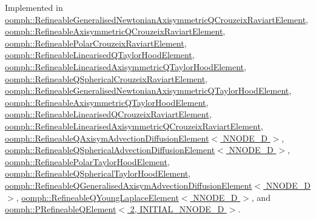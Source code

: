 Implemented in \hyperlink{classoomph_1_1RefineableGeneralisedNewtonianAxisymmetricQCrouzeixRaviartElement_abb293aeb834d1edf4d9f9e0150259e55}{oomph\+::\+Refineable\+Generalised\+Newtonian\+Axisymmetric\+Q\+Crouzeix\+Raviart\+Element}, \hyperlink{classoomph_1_1RefineableAxisymmetricQCrouzeixRaviartElement_a00d870c55a1a8e6596895d4efb5b3db5}{oomph\+::\+Refineable\+Axisymmetric\+Q\+Crouzeix\+Raviart\+Element}, \hyperlink{classoomph_1_1RefineablePolarCrouzeixRaviartElement_a4dabb74925f410045d1d7208a3b29130}{oomph\+::\+Refineable\+Polar\+Crouzeix\+Raviart\+Element}, \hyperlink{classoomph_1_1RefineableLinearisedQTaylorHoodElement_a744e9dabce8e94de320d9baa362786af}{oomph\+::\+Refineable\+Linearised\+Q\+Taylor\+Hood\+Element}, \hyperlink{classoomph_1_1RefineableLinearisedAxisymmetricQTaylorHoodElement_a6675183eb8c772e5a6129be446c8554e}{oomph\+::\+Refineable\+Linearised\+Axisymmetric\+Q\+Taylor\+Hood\+Element}, \hyperlink{classoomph_1_1RefineableQSphericalCrouzeixRaviartElement_a4604904cbdb052492917860518b01aa7}{oomph\+::\+Refineable\+Q\+Spherical\+Crouzeix\+Raviart\+Element}, \hyperlink{classoomph_1_1RefineableGeneralisedNewtonianAxisymmetricQTaylorHoodElement_aef635d4f6f88c070bf0eeda652639795}{oomph\+::\+Refineable\+Generalised\+Newtonian\+Axisymmetric\+Q\+Taylor\+Hood\+Element}, \hyperlink{classoomph_1_1RefineableAxisymmetricQTaylorHoodElement_ae98562e5c0460648cf785dce08aac278}{oomph\+::\+Refineable\+Axisymmetric\+Q\+Taylor\+Hood\+Element}, \hyperlink{classoomph_1_1RefineableLinearisedQCrouzeixRaviartElement_afc31da5de97e9cc03bfc6106e08820f3}{oomph\+::\+Refineable\+Linearised\+Q\+Crouzeix\+Raviart\+Element}, \hyperlink{classoomph_1_1RefineableLinearisedAxisymmetricQCrouzeixRaviartElement_ad2ea85dbb9ac3434f4314a020b45861f}{oomph\+::\+Refineable\+Linearised\+Axisymmetric\+Q\+Crouzeix\+Raviart\+Element}, \hyperlink{classoomph_1_1RefineableQAxisymAdvectionDiffusionElement_a876b090aa3813d3837218a5aecb64404}{oomph\+::\+Refineable\+Q\+Axisym\+Advection\+Diffusion\+Element$<$ N\+N\+O\+D\+E\+\_\+D $>$}, \hyperlink{classoomph_1_1RefineableQSphericalAdvectionDiffusionElement_a0ad422bfa10c757b2cbc3d56209ea642}{oomph\+::\+Refineable\+Q\+Spherical\+Advection\+Diffusion\+Element$<$ N\+N\+O\+D\+E\+\_\+D $>$}, \hyperlink{classoomph_1_1RefineablePolarTaylorHoodElement_aee481f421b3b57536ba7a929f760a337}{oomph\+::\+Refineable\+Polar\+Taylor\+Hood\+Element}, \hyperlink{classoomph_1_1RefineableQSphericalTaylorHoodElement_a2a183774e0992f6464b39b525552b985}{oomph\+::\+Refineable\+Q\+Spherical\+Taylor\+Hood\+Element}, \hyperlink{classoomph_1_1RefineableQGeneralisedAxisymAdvectionDiffusionElement_aea4690891aa8c7a5d0cbb65eb101a3e9}{oomph\+::\+Refineable\+Q\+Generalised\+Axisym\+Advection\+Diffusion\+Element$<$ N\+N\+O\+D\+E\+\_\+D $>$}, \hyperlink{classoomph_1_1RefineableQYoungLaplaceElement_a2bf2a41febf535ba6993e7aafbf769c2}{oomph\+::\+Refineable\+Q\+Young\+Laplace\+Element$<$ N\+N\+O\+D\+E\+\_\+D $>$}, and \hyperlink{classoomph_1_1PRefineableQElement_3_012_00_01INITIAL__NNODE__1D_01_4_a73d08f7b72685de1d8dd9ac30b8ddfec}{oomph\+::\+P\+Refineable\+Q\+Element$<$ 2, I\+N\+I\+T\+I\+A\+L\+\_\+\+N\+N\+O\+D\+E\+\_\+D $>$}.

